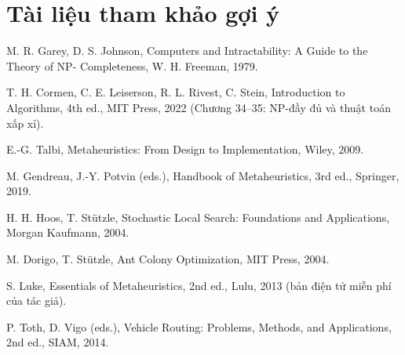 \documentclass[a4paper,11pt]{article}
\begin{document}
\section{Tài liệu tham khảo gợi ý}
\begin{enumerate}[label={[\arabic*]},leftmargin=2em,itemsep=0.4em]
\item M. R. Garey, D. S. Johnson, Computers and Intractability: A Guide to the Theory of NP- Completeness, W. H. Freeman, 1979.
\item T. H. Cormen, C. E. Leiserson, R. L. Rivest, C. Stein, Introduction to Algorithms, 4th ed., MIT Press, 2022 (Chương 34–35: NP-đầy đủ và thuật toán xấp xỉ).
\item E.-G. Talbi, Metaheuristics: From Design to Implementation, Wiley, 2009.
\item M. Gendreau, J.-Y. Potvin (eds.), Handbook of Metaheuristics, 3rd ed., Springer, 2019.
\item H. H. Hoos, T. Stützle, Stochastic Local Search: Foundations and Applications, Morgan Kaufmann, 2004.
\item M. Dorigo, T. Stützle, Ant Colony Optimization, MIT Press, 2004.
\item S. Luke, Essentials of Metaheuristics, 2nd ed., Lulu, 2013 (bản điện tử miễn phí của tác giả).
\item P. Toth, D. Vigo (eds.), Vehicle Routing: Problems, Methods, and Applications, 2nd ed., SIAM, 2014.
\end{enumerate}
\end{document}

